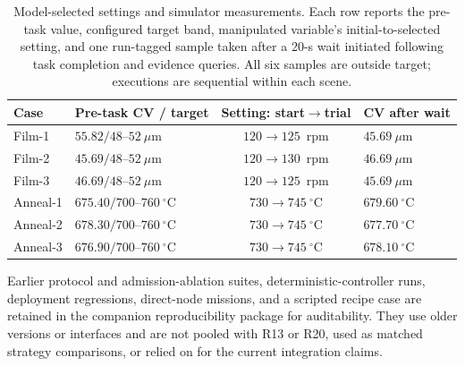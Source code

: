 \begin{table}[!t]
\centering
\caption{Model-selected settings and simulator measurements. Each row
reports the pre-task value, configured target band, manipulated variable's
initial-to-selected setting, and one run-tagged sample taken after a 20-s wait
initiated following task completion and evidence queries. All six samples are
outside target; executions are sequential within each scene.}
\label{tab:q8}
\footnotesize
\setlength{\tabcolsep}{2.5pt}
\begin{tabularx}{\columnwidth}{@{}lXcX@{}}
\toprule
Case & Pre-task CV / target & Setting: start$\to$trial & CV after wait \\
\midrule
Film-1 & $55.82/48$--$52~\mu$m & $120\to125$~rpm & $45.69~\mu$m \\
Film-2 & $45.69/48$--$52~\mu$m & $120\to130$~rpm & $46.69~\mu$m \\
Film-3 & $46.69/48$--$52~\mu$m & $120\to125$~rpm & $45.69~\mu$m \\
Anneal-1 & $675.40/700$--$760~^{\circ}$C & $730\to745~^{\circ}$C & $679.60~^{\circ}$C \\
Anneal-2 & $678.30/700$--$760~^{\circ}$C & $730\to745~^{\circ}$C & $677.70~^{\circ}$C \\
Anneal-3 & $676.90/700$--$760~^{\circ}$C & $730\to745~^{\circ}$C & $678.10~^{\circ}$C \\
\bottomrule
\end{tabularx}
\end{table}

Earlier protocol and admission-ablation suites, deterministic-controller
runs, deployment regressions, direct-node missions, and a scripted recipe
case are retained in the companion reproducibility package for auditability.
They use older versions or interfaces and are not pooled with R13 or R20, used
as matched strategy comparisons, or relied on for the current integration
claims.
